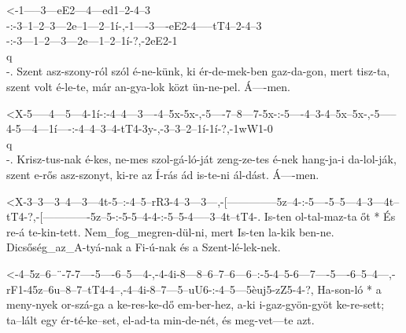   {<-1-----3---eE2---4---ed1--2-4--3\\-:-3--1--2--3---2e--1---2--1í-,-1----3----eE2-4-----tT4--2-4--3\\-:-3---1--2---3---2e---1--2--1í-?,-2eE2-1\\q\\-.}
  {  Szent asz-szony-ról szól é-ne-künk, ki ér-de-mek-ben gaz-da-gon, mert tisz-ta, szent volt é-le-te,   már an-gya-lok közt ün-ne-pel.  Á----men.}


  {<X-5-----4---5---4-1í-:-4--4---3----4--5x-5x-,-5----7--8---7-5x-:-5----4--3-4--5x--5x-,-5-----4-5---4---1í----:-4--4--3--4-tT4-3y-,-3--3--2--1í-1í-?,-1wW1-0\\q\\-.}
  {   Krisz-tus-nak é-kes, ne-mes szol-gá-ló-ját  zeng-ze-tes é-nek  hang-ja-i da-lol-ják, szent e-rős asz-szonyt, ki-re az Í-rás ád   is-te-ni ál-dást. Á----men.}

  {<X-3--3---3--4---3---4t-5--:-4--5--rR3-4--3---3---,-[--------------5z--4-:-5----5--5---4--3---4t--tT4-?,-[-------------5z--5-:-5-5--4-4-:-5--5-4-----3--4t--tT4-.}
  {   Is-ten ol-tal-maz-ta őt * És re-á   te-kin-tett. Nem_fog_megren-dül-ni, mert Is-ten la-kik ben-ne.    Dicsőség_az_A-tyá-nak a Fi-ú-nak és a Szent-lé-lek-nek.}

  {<-4--5z--6--¨-7-7----5----6--5---4-,-4-4i-8---8--6--7--6---6--:-5-4--5-6---7----5----6--5--4---,-rF1-45z--6u--8--7--tT4-4--,-4--4i-8--7---5--uU6-:-4--5---5èuj5-zZ5-4-?,}
  {  Ha-son-ló * a meny-nyek or-szá-ga  a ke-res-ke-dő em-ber-hez, a-ki i-gaz-gyön-gyöt ke-re-sett; ta--lált egy ér-té-ke--set, el-ad-ta min-de-nét,  és meg-vet---te  azt.}